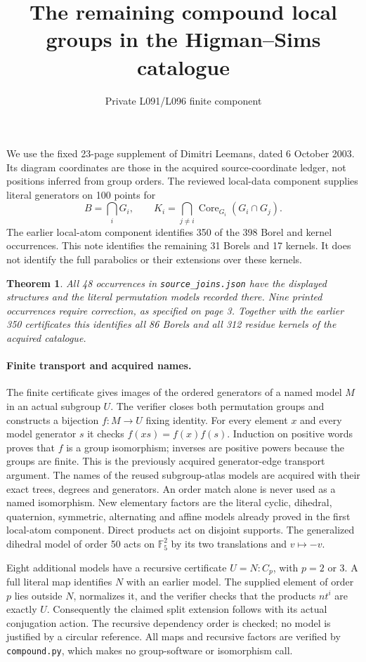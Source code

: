 \documentclass[11pt]{article}
\title{The remaining compound local groups in the Higman--Sims catalogue}
\author{Private L091/L096 finite component}\date{}
\newtheorem{theorem}{Theorem}\newtheorem{lemma}{Lemma}
\begin{document}
\maketitle
We use the fixed 23-page supplement of Dimitri Leemans, dated 6 October
2003. Its diagram coordinates are those in the acquired source-coordinate
ledger, not positions inferred from group orders. The reviewed local-data
component supplies literal generators on 100 points for
\[
 B=\bigcap_iG_i,\qquad
 K_i=\bigcap_{j\ne i}\operatorname{Core}_{G_i}(G_i\cap G_j).
\]
The earlier local-atom component identifies 350 of the 398 Borel and
kernel occurrences. This note identifies the remaining 31 Borels and
17 kernels. It does not identify the full parabolics or their extensions
over these kernels.

\begin{theorem}
All 48 occurrences in \texttt{source\_joins.json} have the displayed
structures and the literal permutation models recorded there. Nine
printed occurrences require correction, as specified on page 3.
Together with the earlier 350 certificates this identifies all 86
Borels and all 312 residue kernels of the acquired catalogue.
\end{theorem}

\paragraph{Finite transport and acquired names.}
The finite certificate gives images of the ordered generators of a named
model $M$ in an actual subgroup $U$. The verifier closes both permutation
groups and constructs a bijection $f:M\to U$ fixing identity. For every
element $x$ and every model generator $s$ it checks
$f(xs)=f(x)f(s)$. Induction on positive words proves that $f$ is a group
isomorphism; inverses are positive powers because the groups are finite.
This is the previously acquired generator-edge transport argument.
The names of the reused subgroup-atlas models are acquired with their
exact trees, degrees and generators. An order match alone is never used
as a named isomorphism. New elementary factors are the literal cyclic,
dihedral, quaternion, symmetric, alternating and affine models already
proved in the first local-atom component. Direct products act on disjoint
supports. The generalized dihedral model of order 50 acts on
$\mathbb F_5^2$ by its two translations and $v\mapsto-v$.

Eight additional models have a recursive certificate $U=N:C_p$, with
$p=2$ or $3$. A full literal map identifies $N$ with an earlier model.
The supplied element of order $p$ lies outside $N$, normalizes it, and
the verifier checks that the products $nt^i$ are exactly $U$. Consequently
the claimed split extension follows with its actual conjugation action.
The recursive dependency order is checked; no model is justified by a
circular reference. All maps and recursive factors are verified by
\texttt{compound.py}, which makes no group-software or isomorphism call.
\end{document}
